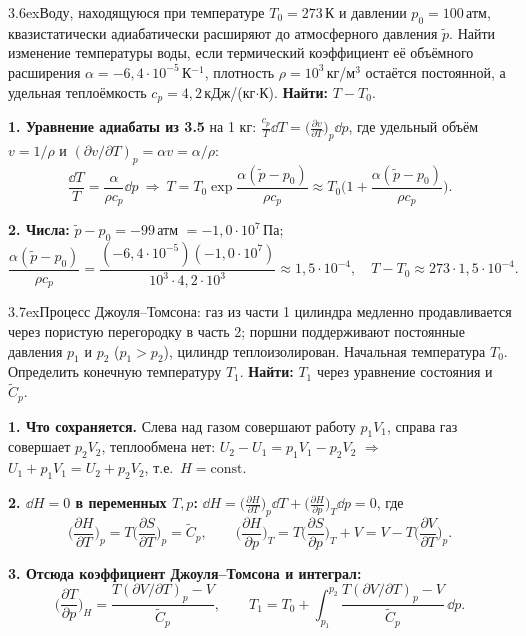 \begin{problem}{3.6}{ex}{Воду, находящуюся при температуре $T_0=273$\,К и давлении $p_0=100$\,атм, квазистатически адиабатически расширяют
до атмосферного давления $\tilde p$. Найти изменение температуры воды, если термический коэффициент её объёмного расширения
$\alpha=-6{,}4\cdot10^{-5}$\,К$^{-1}$, плотность $\rho=10^3$\,кг/м$^3$ остаётся постоянной, а удельная теплоёмкость $c_p=4{,}2$\,кДж/(кг$\cdot$К).}
\textbf{Найти:} $T-T_0$.

\textbf{1. Уравнение адиабаты из 3.5} на 1 кг: $\frac{c_p}{T}\dd T=\big(\frac{\partial v}{\partial T}\big)_p\dd p$, где удельный объём
$v=1/\rho$ и $(\partial v/\partial T)_p=\alpha v=\alpha/\rho$:
\[\frac{\dd T}{T}=\frac{\alpha}{\rho c_p}\dd p\ \Rightarrow\ T=T_0\exp\frac{\alpha(\tilde p-p_0)}{\rho c_p}\approx T_0\Big(1+\frac{\alpha(\tilde p-p_0)}{\rho c_p}\Big).\]

\textbf{2. Числа:} $\tilde p-p_0=-99$\,атм $=-1{,}0\cdot10^7$\,Па;
\[\frac{\alpha(\tilde p-p_0)}{\rho c_p}=\frac{(-6{,}4\cdot10^{-5})(-1{,}0\cdot10^7)}{10^3\cdot4{,}2\cdot10^3}\approx1{,}5\cdot10^{-4},\quad
T-T_0\approx273\cdot1{,}5\cdot10^{-4}.\]
\end{problem}

\begin{problem}{3.7}{ex}{Процесс Джоуля–Томсона: газ из части 1 цилиндра медленно продавливается через пористую перегородку в часть 2;
поршни поддерживают постоянные давления $p_1$ и $p_2$ ($p_1>p_2$), цилиндр теплоизолирован. Начальная температура $T_0$.
Определить конечную температуру $T_1$.}
\textbf{Найти:} $T_1$ через уравнение состояния и $\widetilde C_p$.

\textbf{1. Что сохраняется.} Слева над газом совершают работу $p_1V_1$, справа газ совершает $p_2V_2$, теплообмена нет:
$U_2-U_1=p_1V_1-p_2V_2$ $\Rightarrow$ $U_1+p_1V_1=U_2+p_2V_2$, т.е.\ $H=\mathrm{const}$.

\textbf{2. $\dd H=0$ в переменных $T,p$:} $\dd H=\big(\frac{\partial H}{\partial T}\big)_p\dd T+\big(\frac{\partial H}{\partial p}\big)_T\dd p=0$, где
\[\Big(\frac{\partial H}{\partial T}\Big)_p=T\Big(\frac{\partial S}{\partial T}\Big)_p=\widetilde C_p,\qquad
\Big(\frac{\partial H}{\partial p}\Big)_T=T\Big(\frac{\partial S}{\partial p}\Big)_T+V=V-T\Big(\frac{\partial V}{\partial T}\Big)_p.\]

\textbf{3. Отсюда коэффициент Джоуля–Томсона и интеграл:}
\[\Big(\frac{\partial T}{\partial p}\Big)_H=\frac{T(\partial V/\partial T)_p-V}{\widetilde C_p},\qquad
T_1=T_0+\int_{p_1}^{p_2}\frac{T(\partial V/\partial T)_p-V}{\widetilde C_p}\,\dd p.\]
\end{problem}

